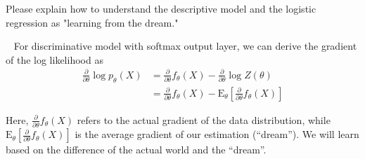 \begin{exercise}[]{Please explain how to understand the descriptive model and the logistic regression as "learning from the dream."}
  \begin{solution}
  \par{~}
  For discriminative model with softmax output layer, we can derive the gradient of the log likelihood as
\begin{equation}
\begin{aligned}
\frac{\partial}{\partial \theta} \log p_{\theta}(X) &=\frac{\partial}{\partial \theta} f_{\theta}(X)-\frac{\partial}{\partial \theta} \log Z(\theta) \\
&=\frac{\partial}{\partial \theta} f_{\theta}(X)-\mathrm{E}_{\theta}\left[\frac{\partial}{\partial \theta} f_{\theta}(X)\right]
\end{aligned}
\end{equation}

Here, $\frac{\partial}{\partial \theta} f_{\theta}(X)$ refers to the actual gradient of the data distribution, while $\mathrm{E}_{\theta}\left[\frac{\partial}{\partial \theta} f_{\theta}(X)\right]$ is the average gradient of our estimation (``dream''). We will learn based on the difference of the actual world and the ``dream''.

  \end{solution}
  \label{ex3}
\end{exercise}


